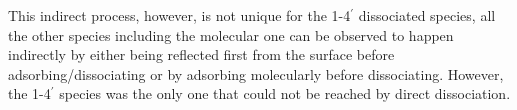 \documentclass[11pt,DIV=13,BCOR=5mm,a4paper,headinclude]{scrbook}
\begin{document}
This indirect process, however, is not unique for the 1-4$^\prime$ dissociated species, all the other species including the molecular one can be observed to happen indirectly by either being reflected first from the surface before adsorbing/dissociating or by adsorbing molecularly before dissociating.
However, the 1-4$^\prime$ species was the only one that could not be reached by direct dissociation.
  \begin{figure}[h!]
  \centering
   \quad
   \quad
   \quad

\end{figure}
\end{document}
